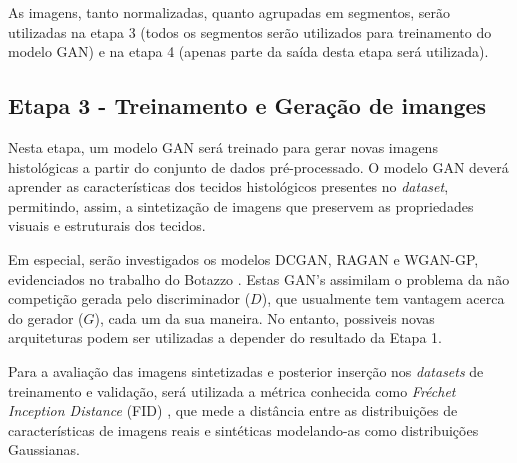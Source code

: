   As imagens, tanto normalizadas, quanto agrupadas em segmentos, serão utilizadas na etapa 3 (todos os segmentos serão utilizados para treinamento do modelo GAN) e na etapa 4 (apenas parte da saída desta etapa será utilizada).  

\subsection{Etapa 3 - Treinamento e Geração de imanges}

Nesta etapa, um modelo GAN será treinado para gerar novas imagens histológicas a partir do conjunto de dados pré-processado. O modelo GAN deverá aprender as características dos tecidos histológicos presentes no \textit{dataset}, permitindo, assim, a sintetização de imagens que preservem as propriedades visuais e estruturais dos tecidos.

Em especial, serão investigados os modelos DCGAN, RAGAN e WGAN-GP, evidenciados no trabalho do Botazzo \cite{rozendo2024histdataaug}. Estas GAN's assimilam o problema da não competição gerada pelo discriminador ($D$), que usualmente tem vantagem acerca do gerador ($G$), cada um da sua maneira. No entanto, possiveis novas arquiteturas podem ser utilizadas a depender do resultado da Etapa 1.

Para a avaliação das imagens sintetizadas e posterior inserção nos \textit{datasets} de treinamento e validação, será utilizada a métrica conhecida como \textit{Fréchet Inception Distance} (FID) \cite{heusel2018ganstrainedtimescaleupdate}, que mede a distância entre as distribuições de características de imagens reais e sintéticas modelando-as como distribuições Gaussianas.

